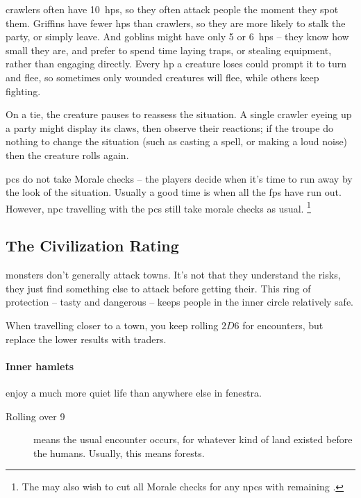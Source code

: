 \begin{multicols}{2}
\Glspl{crawler} often have 10~\glspl{hp}, so they often attack people the moment they spot them.
Griffins have fewer \glspl{hp} than \glspl{crawler}, so they are more likely to stalk the party, or simply leave.
And goblins might have only 5 or 6~\glspl{hp} -- they know how small they are, and prefer to spend time laying traps, or stealing equipment, rather than engaging directly.
Every \gls{hp} a creature loses could prompt it to turn and flee, so sometimes only wounded creatures will flee, while others keep fighting.

On a tie, the creature pauses to reassess the situation.
A single \gls{crawler} eyeing up a party might display its claws, then observe their reactions; if the troupe do nothing to change the situation (such as casting a spell, or making a loud noise) then the creature rolls again.

\Glspl{pc} do not take Morale checks -- the players decide when it's time to run away by the look of the situation.
Usually a good time is when all the \glspl{fp} have run out.
%
However, \gls{npc} travelling with the \glspl{pc} still take morale checks as usual.%
\footnote{The  may also wish to cut all Morale checks for any \glspl{npc} with remaining .}%

\subsection{The Civilization Rating}
\label{civilizationRating}

\Glspl{monster} don't generally attack towns.
It's not that they understand the risks, they just find something else to attack before getting their.
This ring of protection -- tasty and dangerous -- keeps people in the inner circle relatively safe.

When travelling closer to a town, you keep rolling $2D6$ for encounters, but replace the lower results with traders.

\paragraph{Inner hamlets}
enjoy a much more quiet life than anywhere else in \gls{fenestra}.

\null
\begin{description}
  \item[Rolling over 9]
  means the usual encounter occurs, for whatever kind of land existed before the humans.
  Usually, this means forests.


\end{description}
\end{multicols}
